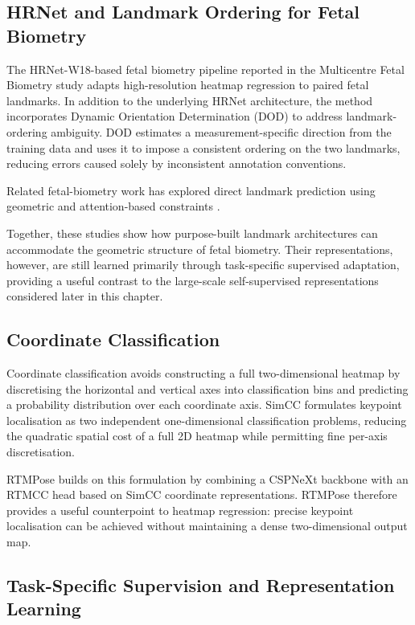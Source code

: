 \subsection{HRNet and Landmark Ordering for Fetal Biometry}
\label{sec:bg-hrnet}

The HRNet-W18-based fetal biometry pipeline reported in the
Multicentre Fetal Biometry study
\parencite{divece2025multicentre} adapts high-resolution heatmap
regression to paired fetal landmarks. In addition to the underlying
HRNet architecture, the method incorporates Dynamic Orientation
Determination (DOD) to address landmark-ordering ambiguity. DOD
estimates a measurement-specific direction from the training data and
uses it to impose a consistent ordering on the two landmarks, reducing
errors caused solely by inconsistent annotation conventions.

Related fetal-biometry work has explored direct landmark prediction
using geometric and attention-based constraints
\parencite{gao2023endpoints}.

Together, these studies show how purpose-built landmark architectures
can accommodate the geometric structure of fetal biometry. Their
representations, however, are still learned primarily through
task-specific supervised adaptation, providing a useful contrast to
the large-scale self-supervised representations considered later in
this chapter.


\subsection{Coordinate Classification}
\label{sec:bg-simcc}

Coordinate classification avoids constructing a full two-dimensional
heatmap by discretising the horizontal and vertical axes into
classification bins and predicting a probability distribution over
each coordinate axis. SimCC \parencite{li2022simcc} formulates
keypoint localisation as two independent one-dimensional
classification problems, reducing the quadratic spatial cost of a
full 2D heatmap while permitting fine per-axis discretisation.

RTMPose \parencite{jiang2023rtmpose} builds on this formulation by
combining a CSPNeXt backbone with an RTMCC head based on SimCC
coordinate representations. RTMPose therefore provides a useful
counterpoint to heatmap regression: precise keypoint localisation can
be achieved without maintaining a dense two-dimensional output map.


\subsection{Task-Specific Supervision and Representation Learning}

